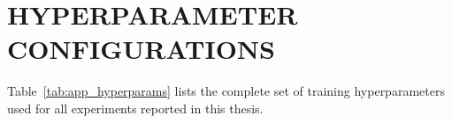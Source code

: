 \documentclass[12pt,a4paper]{report}
\begin{document}

\newpage
\pagestyle{plain}
\printbibliography[heading=bibintoc, title={REFERENCES}]

\appendix
\chapter{HYPERPARAMETER CONFIGURATIONS}
\label{app:hyperparams}

Table~\ref{tab:app_hyperparams} lists the complete set of training hyperparameters
used for all experiments reported in this thesis.
\end{document}

